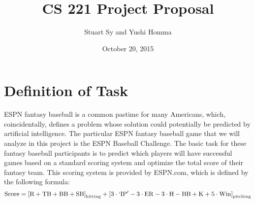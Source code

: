 \documentclass{amsart}
\begin{document}
\title{CS 221 Project Proposal}
\author{Stuart Sy and Yushi Homma}
\date{October 20, 2015}
\maketitle
\section{Definition of Task}
ESPN fantasy baseball is a common pastime for many Americans, which, coincidentally, defines a problem whose solution could potentially be predicted by artificial intelligence. The particular ESPN fantasy baseball game that we will analyze in this project is the ESPN Baseball Challenge. The basic task for these fantasy baseball participants is to predict which players will have successful games based on a standard scoring system and optimize the total score of their fantasy team. This scoring system is provided by ESPN.com, which is defined by the following formula:
\begin{equation}
\mathrm{Score} = \left[\mathrm{R} + \mathrm{TB} + \mathrm{BB} + \mathrm{SB}\right]_{\rm hitting} + \left[3\cdot \mathrm{`IP'} - 3\cdot \mathrm{ER} - 3\cdot \mathrm{H} - \mathrm{BB} + \mathrm{K} + 5 \cdot \mathrm{Win} \right]_{\rm pitching}
\end{equation}
\end{document}
